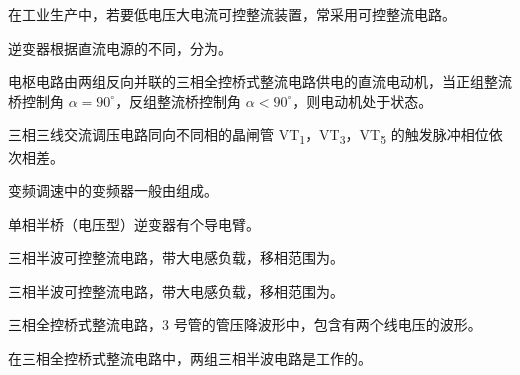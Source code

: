 \documentclass[电力电子]{subfiles}
\begin{document}
\begin{ti}
	在工业生产中，若要低电压大电流可控整流装置，常采用可控整流电路。
\end{ti}

\begin{ti}
	逆变器根据直流电源的不同，分为。
\end{ti}

\begin{ti}
	电枢电路由两组反向并联的三相全控桥式整流电路供电的直流电动机，当正组整流桥控制角 $\alpha = 90^\circ$，反组整流桥控制角 $\alpha < 90^\circ$，则电动机处于状态。
\end{ti}

\begin{ti}
	三相三线交流调压电路同向不同相的晶闸管 VT\textsubscript{1}，VT\textsubscript{3}，VT\textsubscript{5} 的触发脉冲相位依次相差。
\end{ti}

\begin{ti}
	变频调速中的变频器一般由组成。
\end{ti}

\begin{ti}
	单相半桥（电压型）逆变器有个导电臂。
\end{ti}

\begin{ti}
	三相半波可控整流电路，带大电感负载，移相范围为。
\end{ti}

\begin{ti}
	三相半波可控整流电路，带大电感负载，移相范围为。
\end{ti}

\begin{ti}
	三相全控桥式整流电路，3 号管的管压降波形中，包含有两个线电压的波形。
\end{ti}

\begin{ti}
	在三相全控桥式整流电路中，两组三相半波电路是工作的。
\end{ti}
\end{document}
